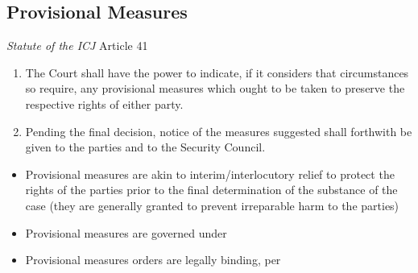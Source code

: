 \subsection{Provisional Measures}
\begin{statutedetails}{\textit{Statute of the ICJ} Article 41}
    \flushleft
    \begin{enumerate}
        \item The Court shall have the power to indicate, if it considers that circumstances so require, any provisional measures which ought to be taken to preserve the respective rights of either party.
        \item Pending the final decision, notice of the measures suggested shall forthwith be given to the parties and to the Security Council.
    \end{enumerate}
\end{statutedetails}

\begin{itemize}
    \item Provisional measures are akin to interim/interlocutory relief to protect the rights of the parties prior to the final determination of the substance of the case (they are generally granted to prevent irreparable harm to the parties)
    \item Provisional measures are governed under 
    \item Provisional measures orders are legally binding, per 
\end{itemize}

